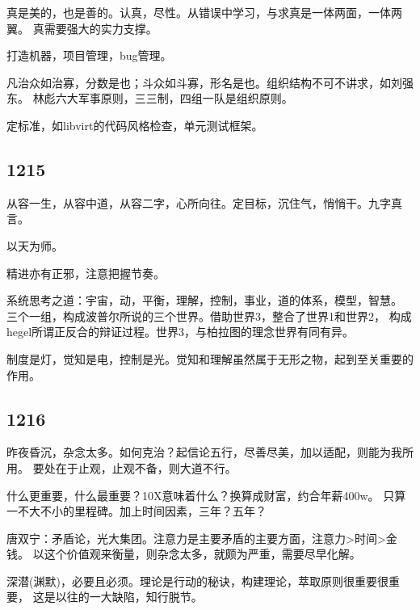 真是美的，也是善的。认真，尽性。从错误中学习，与求真是一体两面，一体两翼。
真需要强大的实力支撑。

打造机器，项目管理，bug管理。

凡治众如治寡，分数是也；斗众如斗寡，形名是也。组织结构不可不讲求，如刘强东。
林彪六大军事原则，三三制，四组一队是组织原则。

定标准，如libvirt的代码风格检查，单元测试框架。

\subsection{1215}

从容一生，从容中道，从容二字，心所向往。定目标，沉住气，悄悄干。九字真言。

以天为师。

精进亦有正邪，注意把握节奏。

系统思考之道：宇宙，动，平衡，理解，控制，事业，道的体系，模型，智慧。
三个一组，构成波普尔所说的三个世界。借助世界3，整合了世界1和世界2，
构成hegel所谓正反合的辩证过程。世界3，与柏拉图的理念世界有同有异。

制度是灯，觉知是电，控制是光。觉知和理解虽然属于无形之物，起到至关重要的作用。

\subsection{1216}

昨夜昏沉，杂念太多。如何克治？起信论五行，尽善尽美，加以适配，则能为我所用。
要处在于止观，止观不备，则大道不行。

什么更重要，什么最重要？10X意味着什么？换算成财富，约合年薪400w。
只算一不大不小的里程碑。加上时间因素，三年？五年？

唐双宁：矛盾论，光大集团。注意力是主要矛盾的主要方面，注意力>时间>金钱。
以这个价值观来衡量，则杂念太多，就颇为严重，需要尽早化解。

深潜(渊默)，必要且必须。理论是行动的秘诀，构建理论，萃取原则很重要很重要，
这是以往的一大缺陷，知行脱节。

